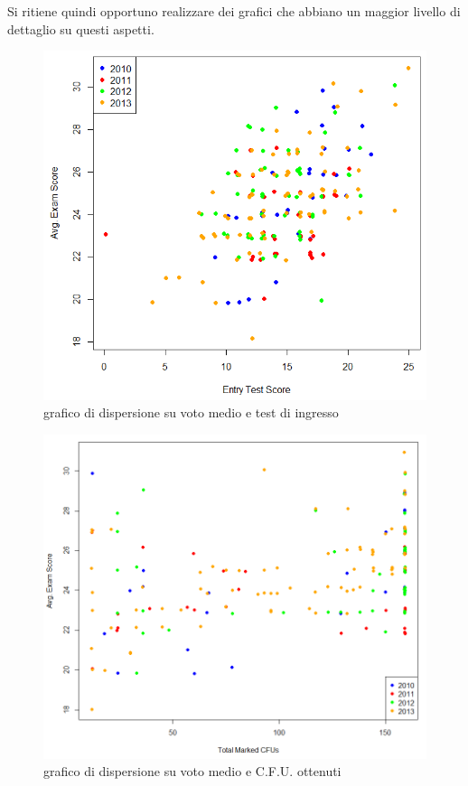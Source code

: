             Si ritiene quindi opportuno realizzare dei grafici che abbiano un maggior livello di dettaglio su questi aspetti.

            \begin{figure}
                \centering
                \caption{grafico di dispersione su voto medio e test di ingresso}
                \label{fig2}
            	\includegraphics[scale=0.5]{img/scatter_plot_2.png}
            \end{figure}

            \begin{figure}
                \centering
                \caption{grafico di dispersione su voto medio e C.F.U. ottenuti}
                \label{fig3}
            	\includegraphics[scale=0.40]{img/scatter_plot_3.png}
            \end{figure}

